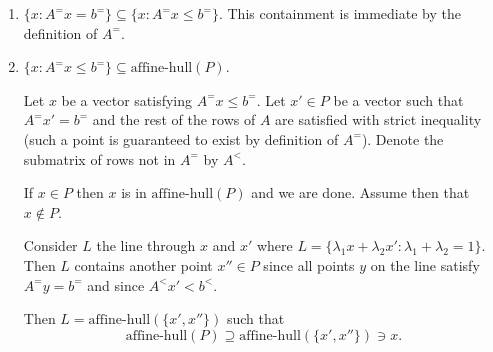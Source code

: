 \documentclass[11pt]{article}
\renewcommand{\leq}{\leqslant}
\begin{document}
\begin{enumerate}[1)]
\begin{solution}
\begin{enumerate}
\item $\{x : A^= x = b^=\} \subseteq \{x : A^= x \leq b^=\}$. This containment is immediate by the definition of $A^=$. 

\item $\{x : A^= x \leq b^=\} \subseteq \text{affine-hull}(P)$. 


Let  $x$ be a vector satisfying $ A^= x \leq b^=$. Let $x'\in P$ be a vector such that $A^= x' = b^=$ and the rest of the rows of $A$ are satisfied with strict inequality (such a point is guaranteed to exist by definition of $A^=$). Denote the submatrix of rows not in $A^=$ by $A^<$. 

If $x \in P$ then $x$ is in $\text{affine-hull}(P)$ and we are done. Assume then that $x \notin P$.

Consider $L$ the line through $x$ and $x'$ where $L = \{\lambda_1 x + \lambda_2 x': \lambda_1 + \lambda_2 = 1\}$. Then $L$ contains another point $x'' \in P$ since all points $y$ on the line satisfy $A^= y = b^=$ and since $A^< x' < b^<$. 

Then $L = \text{affine-hull}(\{x', x''\})$ such that $$\text{affine-hull}(P) \supseteq \text{affine-hull}(\{x', x''\}) \ni x.$$
\end{enumerate}

\end{solution}


\end{enumerate}



  
\end{document}
